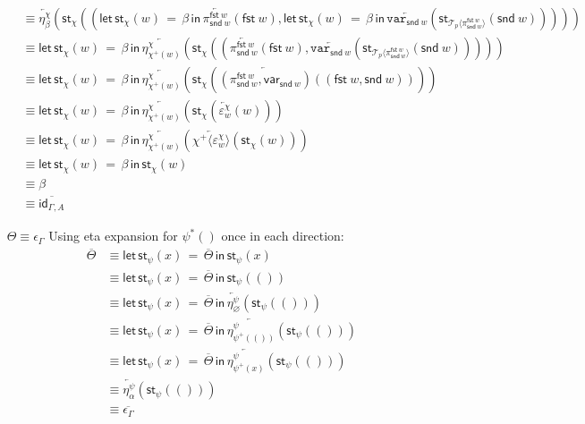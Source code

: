 \documentclass[10pt]{article}
\theoremstyle{definition}
\let\emptyset\varnothing
\newcommand\dsd[1]{\ensuremath{\mathsf{#1}}}
\newcommand{\app}[2]{\ensuremath{#1 \: #2}}
\newcommand{\fst}[1]{\app{\dsd{fst}}{#1}}
\newcommand{\snd}[1]{\app{\dsd{snd}}{#1}}
\newcommand{\id}{\mathsf{id}}
\newcommand{\rewrite}[2]{\overleftarrow{#1}(#2)}
\newcommand\St[2]{\ensuremath{{#1}^*(#2)}}
\newcommand\StI[2]{\ensuremath{\mathsf{st}_{#1}(#2)}}
\newcommand\StE[4]{\ensuremath{\mathsf{let} \, \StI{#1}{#3} \, = \, {#2} \, \mathsf{in} \, #4}}
\newcommand\TrPlus[2]{\ensuremath{{#1}^+(#2)}}
\newcommand\ApEl[2]{\mathcal{T}_{#1}\langle#2\rangle}
\newcommand\ApPlus[2]{\ensuremath{{#1}^+ \langle #2 \rangle }}
\newcommand{\upstairs}[1]{\overline{#1}}
\newcommand\qvar[1]{\ensuremath{\mathsf{var}_{#1}}}
\newcommand\var[1]{\ensuremath{\mathtt{var}_{#1}}}
\begin{document}
\begin{enumerate}[style = multiline, labelwidth = 80pt]
\begin{align*}
&\equiv \rewrite{\eta^\chi_{\beta}}{\StI{\chi}{(\StE{\chi}{\beta}{w}{\rewrite{\pi^{\fst w}_{\snd w}}{\fst w}}, \StE{\chi}{\beta}{w}{\rewrite{\var{\snd w}}{\StI{\ApEl{p}{\pi^{\fst w}_{\snd w}}}{\snd w}}})}} \\
&\equiv \StE{\chi}{\beta}{w}{\rewrite{\eta^\chi_{\TrPlus{\chi}{w}}}{\StI{\chi}{(\rewrite{\pi^{\fst w}_{\snd w}}{\fst w}, \rewrite{\var{\snd w}}{\StI{\ApEl{p}{\pi^{\fst w}_{\snd w}}}{\snd w}})}}} \\
&\equiv \StE{\chi}{\beta}{w}{\rewrite{\eta^\chi_{\TrPlus{\chi}{w}}}{\StI{\chi}{\rewrite{(\pi^{\fst w}_{\snd w},\qvar{\snd w})}{(\fst w, \snd w)}}}} \\
&\equiv \StE{\chi}{\beta}{w}{\rewrite{\eta^\chi_{\TrPlus{\chi}{w}}}{\StI{\chi}{\rewrite{\varepsilon^\chi_w}{w}}}} \\
&\equiv \StE{\chi}{\beta}{w}{\rewrite{\eta^\chi_{\TrPlus{\chi}{w}}}{\rewrite{\ApPlus{\chi}{\varepsilon^\chi_w}}{\StI{\chi}{w}}}} \\
&\equiv \StE{\chi}{\beta}{w}{\StI{\chi}{w}} \\
&\equiv \beta \\
&\equiv \upstairs{\id_{\Gamma, A}}
\end{align*}

\item[$\Theta \equiv \epsilon_\Gamma$] Using eta expansion for $\St{\psi}{}$ once in each direction:
\begin{align*}
\upstairs{\Theta} 
&\equiv \StE{\psi}{\upstairs{\Theta}}{x}{\StI{\psi}{x}} \\
&\equiv \StE{\psi}{\upstairs{\Theta}}{x}{\StI{\psi}{()}} \\
&\equiv \StE{\psi}{\upstairs{\Theta}}{x}{\rewrite{\eta^\psi_{\emptyset}}{\StI{\psi}{()}}} \\
&\equiv \StE{\psi}{\upstairs{\Theta}}{x}{\rewrite{\eta^\psi_{\TrPlus{\psi}{()}}}{\StI{\psi}{()}}} \\
&\equiv \StE{\psi}{\upstairs{\Theta}}{x}{\rewrite{\eta^\psi_{\TrPlus{\psi}{x}}}{\StI{\psi}{()}}} \\
&\equiv \rewrite{\eta^\psi_{\alpha}}{\StI{\psi}{()}} \\
&\equiv \upstairs{\epsilon_\Gamma}
\end{align*}
\end{enumerate}
\end{document}

